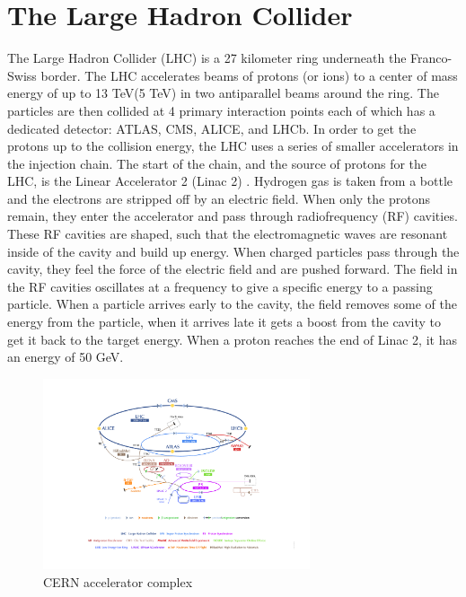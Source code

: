 \section{The Large Hadron Collider}
The Large Hadron Collider (LHC) is a 27 kilometer ring underneath the Franco-Swiss border. The LHC accelerates beams of protons (or ions) to a center of mass energy of up to 13 TeV(5 TeV) in two antiparallel beams around the ring. The particles are then collided at 4 primary interaction points each of which has a dedicated detector: ATLAS, CMS, ALICE, and LHCb.\linebreak
\indent In order to get the protons up to the collision energy, the LHC uses a series of smaller accelerators in the injection chain. The start of the chain, and the source of protons for the LHC, is the Linear Accelerator 2 (Linac 2) \cite{accelerator:1997427}. Hydrogen gas is taken from a bottle and the electrons are stripped off by an electric field. When only the protons remain, they enter the accelerator and pass through radiofrequency (RF) cavities. These RF cavities are shaped, such that the electromagnetic waves are resonant inside of the cavity and build up energy. When charged particles pass through the cavity, they feel the force of the electric field and are pushed forward. The field in the RF cavities oscillates at a frequency to give a specific energy to a passing particle. When a particle arrives early to the cavity, the field removes some of the energy from the particle, when it arrives late it gets a boost from the cavity to get it back to the target energy. When a proton reaches the end of Linac 2, it has an energy of 50 GeV.\linebreak

\begin{figure}[h]
\begin{center}
\includegraphics*[width=0.70\textwidth] {figures/CERN_Accelerator_Complex}%
\caption[CERN accelerator complex \cite{DeMelis:2119882}]{CERN accelerator complex \cite{DeMelis:2119882}}
\label{fig:CERN_ACC}
\end{center}
\end{figure}


